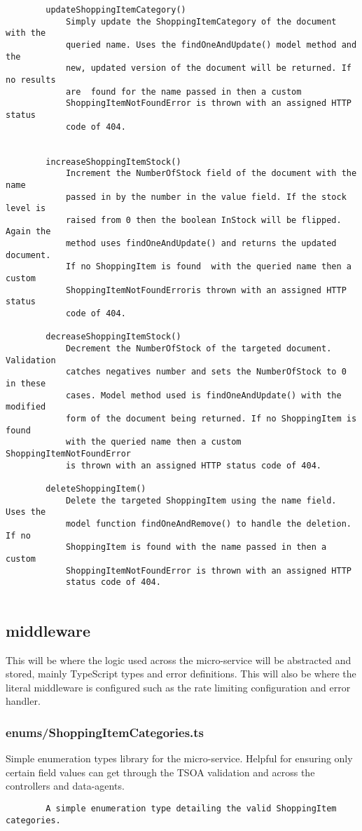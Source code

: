 \begin{verbatim}
        updateShoppingItemCategory()
            Simply update the ShoppingItemCategory of the document with the
            queried name. Uses the findOneAndUpdate() model method and the
            new, updated version of the document will be returned. If no results 
            are  found for the name passed in then a custom 
            ShoppingItemNotFoundError is thrown with an assigned HTTP status 
            code of 404.
        
        
        increaseShoppingItemStock()
            Increment the NumberOfStock field of the document with the name
            passed in by the number in the value field. If the stock level is
            raised from 0 then the boolean InStock will be flipped. Again the
            method uses findOneAndUpdate() and returns the updated document.
            If no ShoppingItem is found  with the queried name then a custom  
            ShoppingItemNotFoundErroris thrown with an assigned HTTP status 
            code of 404.
            
        decreaseShoppingItemStock()
            Decrement the NumberOfStock of the targeted document. Validation
            catches negatives number and sets the NumberOfStock to 0 in these
            cases. Model method used is findOneAndUpdate() with the modified 
            form of the document being returned. If no ShoppingItem is found 
            with the queried name then a custom  ShoppingItemNotFoundError 
            is thrown with an assigned HTTP status code of 404.
        
        deleteShoppingItem()
            Delete the targeted ShoppingItem using the name field. Uses the
            model function findOneAndRemove() to handle the deletion. If no 
            ShoppingItem is found with the name passed in then a custom 
            ShoppingItemNotFoundError is thrown with an assigned HTTP 
            status code of 404.
        
\end{verbatim}
\subsection{middleware}
This will be where the logic used across the micro-service will be abstracted and stored, mainly TypeScript types and error definitions. This will also be where the literal middleware is configured such as the rate limiting configuration and error handler.
\subsubsection{enums/ShoppingItemCategories.ts}
Simple enumeration types library for the micro-service. Helpful for ensuring only certain field values can get through the TSOA validation and across the controllers and data-agents.
\begin{verbatim}
        A simple enumeration type detailing the valid ShoppingItem categories.
\end{verbatim}

